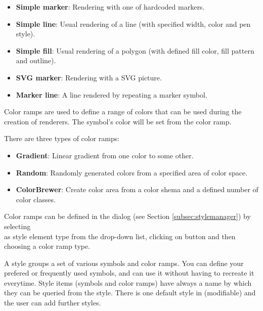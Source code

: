 
\begin{itemize}[label=--]
\item \textbf{Simple marker}: Rendering with one of hardcoded markers.
\item \textbf{Simple line}: Usual rendering of a line (with specified
width, color and pen style).
\item \textbf{Simple fill}: Usual rendering of a polygon (with defined
fill color, fill pattern and outline).
\item \textbf{SVG marker}: Rendering with a SVG picture.
\item \textbf{Marker line}: A line rendered by repeating a marker symbol.
\end{itemize}


Color ramps are used to define a range of colors that can be used during
the creation of renderers. The symbol's color will be set from the color ramp.

There are three types of color ramps:

\begin{itemize}[label=--]
\item \textbf{Gradient}: Linear gradient from one color to some other.
\item \textbf{Random}: Randomly generated colors from a specified area of
color space.
\item \textbf{ColorBrewer}: Create color area from a color shema and a defined
number of color classes.
\end{itemize}

Color ramps can be defined in the  dialog (see Section
\ref{subsec:stylemanager}) by selecting \\
 as style element type from the drop-down list, clicking on  button and then choosing a color ramp type.


A style groups a set of various symbols and color ramps. You can define your
prefered or frequently used symbols, and can use it  without having to recreate
it everytime. Style items (symbols and color ramps) have always a name by which
they can be queried from the style. There is one default style in \qg (modifiable)
and the user can add further styles.


